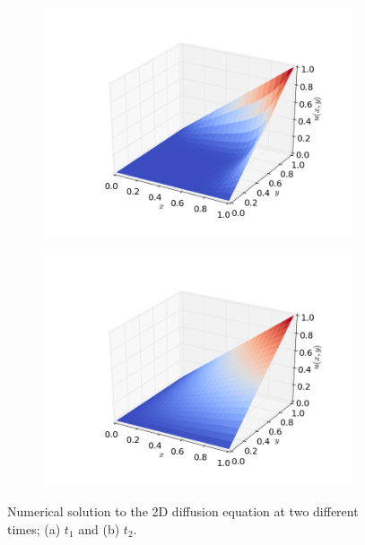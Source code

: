 \documentclass[12pt, a4paper]{article}
\begin{document}
\begin{figure}[ht!]
	\centering 
	\begin{subfigure}[b]{0.495\textwidth}
		\includegraphics[width=\textwidth]{../Programs/Output/Diffusion_2d_t1.png}
        \caption{}
  	\end{subfigure}
  	\begin{subfigure}[b]{0.495\textwidth}
		\includegraphics[width=\textwidth]{../Programs/Output/Diffusion_2d_t2.png}
        \caption{}
  	\end{subfigure}	
  	\caption{Numerical solution to the 2D diffusion equation at two different times; 
  	(a) $t_1$ and (b) $t_2$.}
  	\label{fig:2d}
\end{figure}
\end{document}
